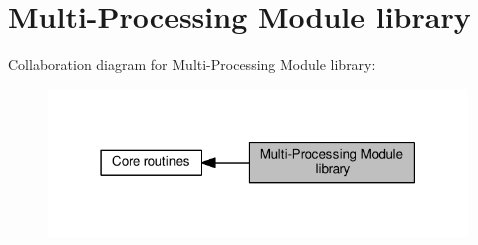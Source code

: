 \hypertarget{group__APACHE__CORE__MPM}{}\section{Multi-\/\+Processing Module library}
\label{group__APACHE__CORE__MPM}
Collaboration diagram for Multi-\/\+Processing Module library\+:
\nopagebreak
\begin{figure}[H]
\begin{center}
\leavevmode
\includegraphics[width=315pt]{group__APACHE__CORE__MPM}
\end{center}
\end{figure}
